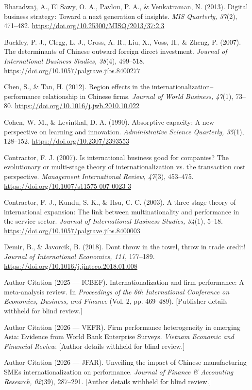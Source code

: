 \documentclass[12pt,a4paper]{article}
\begin{document}
Bharadwaj, A., El Sawy, O. A., Pavlou, P. A., \& Venkatraman, N. (2013).
Digital business strategy: Toward a next generation of insights.
\emph{MIS Quarterly, 37}(2), 471--482.
\url{https://doi.org/10.25300/MISQ/2013/37:2.3}

Buckley, P. J., Clegg, L. J., Cross, A. R., Liu, X., Voss, H., \& Zheng,
P. (2007). The determinants of Chinese outward foreign direct
investment. \emph{Journal of International Business Studies, 38}(4),
499--518. \url{https://doi.org/10.1057/palgrave.jibs.8400277}

Chen, S., \& Tan, H. (2012). Region effects in the
internationalization--performance relationship in Chinese firms.
\emph{Journal of World Business, 47}(1), 73--80.
\url{https://doi.org/10.1016/j.jwb.2010.10.022}

Cohen, W. M., \& Levinthal, D. A. (1990). Absorptive capacity: A new
perspective on learning and innovation. \emph{Administrative Science
Quarterly, 35}(1), 128--152. \url{https://doi.org/10.2307/2393553}

Contractor, F. J. (2007). Is international business good for companies?
The evolutionary or multi-stage theory of internationalization vs. the
transaction cost perspective. \emph{Management International Review,
47}(3), 453--475. \url{https://doi.org/10.1007/s11575-007-0023-3}

Contractor, F. J., Kundu, S. K., \& Hsu, C.-C. (2003). A three-stage
theory of international expansion: The link between multinationality and
performance in the service sector. \emph{Journal of International
Business Studies, 34}(1), 5--18.
\url{https://doi.org/10.1057/palgrave.jibs.8400003}

Demir, B., \& Javorcik, B. (2018). Don\textquotesingle t throw in the
towel, throw in trade credit! \emph{Journal of International Economics,
111}, 177--189. \url{https://doi.org/10.1016/j.jinteco.2018.01.008}

Author Citation (2025 --- ICBEF). Internationalization and firm
performance: A meta-analysis review. In \emph{Proceedings of the 6th
International Conference on Economics, Business, and Finance} (Vol. 2,
pp. 469--489). {[}Publisher details withheld for blind review.{]}

Author Citation (2026 --- VEFR). Firm performance heterogeneity in
emerging Asia: Evidence from World Bank Enterprise Surveys.
\emph{Vietnam Economic and Financial Review}. {[}Author details withheld
for blind review.{]}

Author Citation (2026 --- JFAR). Unveiling the impact of Chinese
manufacturing SMEs\textquotesingle{} internationalization on
performance. \emph{Journal of Finance \& Accounting Research, 02}(39),
287--291. {[}Author details withheld for blind review.{]}
\end{document}
